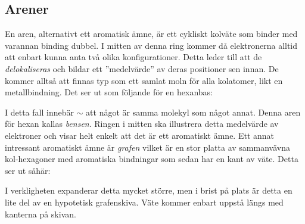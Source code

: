 \subsection{Arener}
En aren, alternativt ett aromatisk ämne, är ett cykliskt kolväte som binder med varannan binding dubbel. I mitten av denna ring kommer då elektronerna alltid att enbart kunna anta två olika konfigurationer. Detta leder till att de \emph{delokaliseras} och bildar ett ''medelvärde'' av deras positioner sen innan. De kommer alltså att finnas typ som ett samlat moln för alla kolatomer, likt en metallbindning. Det ser ut som följande för en hexanbas:
\begin{center}
\end{center}

I detta fall innebär $\sim$ att något är samma molekyl som något annat. Denna aren för hexan kallas \emph{bensen}. Ringen i mitten ska illustrera detta medelvärde av elektroner och visar helt enkelt att det är ett aromatiskt ämne. Ett annat intressant aromatiskt ämne är \emph{grafen} vilket är en stor platta av sammanvävna kol-hexagoner med aromatiska bindningar som sedan har en kant av väte. Detta ser ut såhär:
\begin{center}
\end{center}
I verkligheten expanderar detta mycket större, men i brist på plats är detta en lite del av en hypotetisk grafenskiva. Väte kommer enbart uppstå längs med kanterna på skivan.